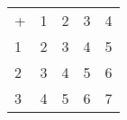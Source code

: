 \begin{table}[h]
\centering
\begin{tabular}{lllll}
+ & 1 & 2 & 3 & 4 \\
1 & 2 & 3 & 4 & 5 \\
2 & 3 & 4 & 5 & 6 \\
3 & 4 & 5 & 6 & 7
\end{tabular}
\end{table}